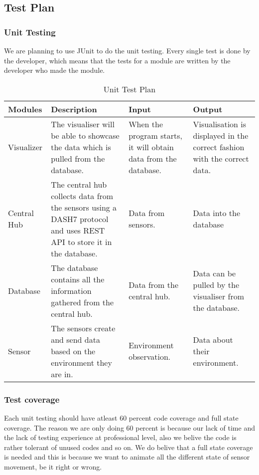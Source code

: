 \documentclass[../document]{subfiles}
\begin{document}
\subsection{Test Plan}
\label{test_plan}
\subsubsection{Unit Testing}
We are planning to use JUnit to do the unit testing. Every single test is done by the developer, which means that the tests for a module are written by the developer who made the module. 

\begin{table}[H]
\caption{Unit Test Plan}
\centering
\begin{tabularx}{\textwidth}{|l|X|X|X|}
	\hline
	Modules
	&Description
	&Input
	&Output
	\\ \hline Visualizer
	&The visualiser will be able to showcase the data which is pulled from the database.
	&When the program starts, it will obtain data from the database.
	&Visualisation is displayed in the correct fashion with the correct data.
	\\ \hline Central Hub
	&The central hub collects data from the sensors using a DASH7 protocol and uses REST API to store it in the database.
	&Data from sensors.
	&Data into the database
	\\ \hline Database
	&The database contains all the information gathered from the central hub.
	&Data from the central hub.
	&Data can be pulled by the visualiser from the database.
	\\ \hline Sensor
	&The sensors create and send data based on the environment they are in.
	&Environment observation.
	&Data about their environment.
	\\ \hline 
\end{tabularx}
\end{table}

\subsubsection{Test coverage}
Each unit testing should have atleast 60 percent code coverage and full state coverage. The reason we are only doing 60 percent is because our lack of time and the lack of testing experience at professional level, also we belive the code is rather tolerant of unused codes and so on. We do belive that a full state coverage is needed and this is because we want to animate all the different state of sensor movement, be it right or wrong. 
\end{document}
